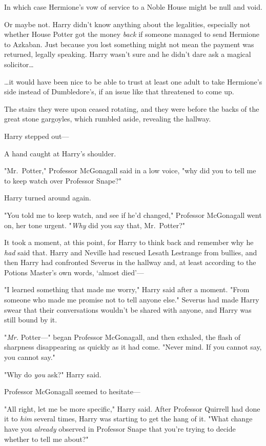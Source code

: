 In which case Hermione's vow of service to a Noble House might be null and void.

Or maybe not. Harry didn't know anything about the legalities, especially not 
whether House Potter got the money \emph{back} if someone managed to send 
Hermione to Azkaban. Just because you lost something might not mean the payment 
was returned, legally speaking. Harry wasn't sure and he didn't dare ask a 
magical solicitor{\ldots}

{\ldots}it would have been nice to be able to trust at least one adult to take 
Hermione's side instead of Dumbledore's, if an issue like that threatened to 
come up.

The stairs they were upon ceased rotating, and they were before the backs of 
the great stone gargoyles, which rumbled aside, revealing the hallway.

Harry stepped out---

A hand caught at Harry's shoulder.

"Mr.~Potter," Professor McGonagall said in a low voice, "why did you to tell me 
to keep watch over Professor Snape?"

Harry turned around again.

"You told me to keep watch, and see if he'd changed," Professor McGonagall went 
on, her tone urgent. "\emph{Why} did you say that, Mr.~Potter?"

It took a moment, at this point, for Harry to think back and remember why he 
\emph{had} said that. Harry and Neville had rescued Lesath Lestrange from 
bullies, and then Harry had confronted Severus in the hallway and, at least 
according to the Potions Master's own words, `almost died'---

"I learned something that made me worry," Harry said after a moment. "From 
someone who made me promise not to tell anyone else." Severus had made Harry 
swear that their conversations wouldn't be shared with anyone, and Harry was 
still bound by it.

"\emph{Mr.} Potter---" began Professor McGonagall, and then exhaled, the flash 
of sharpness disappearing as quickly as it had come. "Never mind. If you cannot 
say, you cannot say."

"Why do \emph{you} ask?" Harry said.

Professor McGonagall seemed to hesitate---

"All right, let me be more specific," Harry said. After Professor Quirrell had 
done it to \emph{him} several times, Harry was starting to get the hang of it. 
"What change have you \emph{already} observed in Professor Snape that you're 
trying to decide whether to tell me about?"

